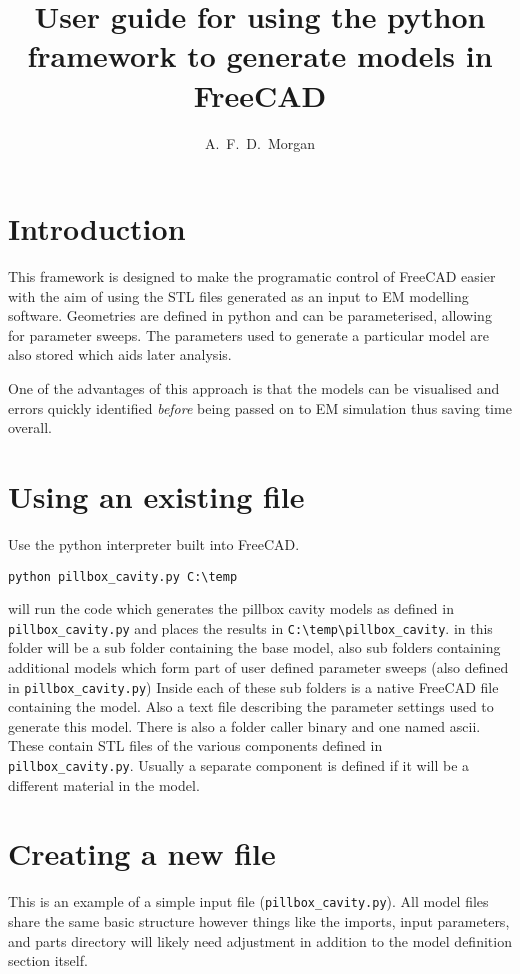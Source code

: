 \documentclass{report}
\newcommand{\docTitle}{User guide for using the python framework to generate models in FreeCAD}
\newcommand{\docAuthor}{A.~F.~D.~Morgan}
\begin{document}
\title{\bf{\docTitle}}
\author{\docAuthor}
\maketitle
\tableofcontents

\chapter{Introduction}
This framework is designed to make the programatic control of FreeCAD easier with the aim of using the STL files generated as an input to EM modelling software. Geometries are defined in python and can be parameterised, allowing for parameter sweeps. The parameters used to generate a particular model are also stored which aids later analysis. 

One of the advantages of this approach is that the models can be visualised and errors quickly identified \emph{before} being passed on to EM simulation thus saving time overall.
\chapter{Using an existing file} 
Use the python interpreter built into FreeCAD.
\begin{verbatim}
python pillbox_cavity.py C:\temp
\end{verbatim}
will run the code which generates the pillbox cavity models as defined in \verb|pillbox_cavity.py| and places the results in \verb|C:\temp\pillbox_cavity|.
in this folder will be a sub folder containing the base model, also sub folders containing additional models which form part of user defined parameter sweeps (also defined in \verb|pillbox_cavity.py|)
Inside each of these sub folders is a native FreeCAD file containing the model. Also a text file describing the parameter settings used to generate this model. There is also a folder caller binary and one named ascii. These contain STL files of the various components defined in \verb|pillbox_cavity.py|. Usually a separate component is defined if it will be a different material in the model.

\chapter{Creating a new file}
\label{chap:Creating a new file}
This is an example of a simple input file (\verb|pillbox_cavity.py|). All model files share the same basic structure however things like the imports, input parameters, and parts directory will likely need adjustment in addition to the model definition section itself.
\end{document}
